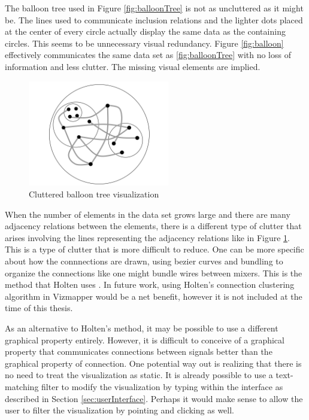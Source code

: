 The balloon tree used in Figure \ref{fig:balloonTree} is not as uncluttered as it might be. The lines used to communicate inclusion relations and the lighter dots placed at the center of every circle actually display the same data as the containing circles. This seems to be unnecessary visual redundancy. Figure \ref{fig:balloon} effectively communicates the same data set as \ref{fig:balloonTree} with no loss of information and less clutter. The missing visual elements are implied.

\begin{figure}[htb]
\centering
\includegraphics[width=0.55\textwidth]{clutter_balloon.png}
\caption{Cluttered balloon tree visualization}
\label{fig:clutterBalloon}
\end{figure}

When the number of elements in the data set grows large and there are many adjacency relations between the elements, there is a different type of clutter that arises involving the lines representing the adjacency relations like in Figure \ref{fig:clutterBalloon}. This is a type of clutter that is more difficult to reduce. One can be more specific about how the connnections are drawn, using bezier curves and bundling to organize the connections like one might bundle wires between mixers. This is the method that Holten uses \cite{edgebundles2006}. In future work, using Holten's connection clustering algorithm in Vizmapper would be a net benefit, however it is not included at the time of this thesis. 

As an alternative to Holten's method, it may be possible to use a different graphical property entirely. However, it is difficult to conceive of a graphical property that communicates connections between signals better than the graphical property of connection. One potential way out is realizing that there is no need to treat the visualization as static. It is already possible to use a text-matching filter to modify the visualization by typing within the interface as described in Section \ref{sec:userInterface}. Perhaps it would make sense to allow the user to filter the visualization by pointing and clicking as well.

